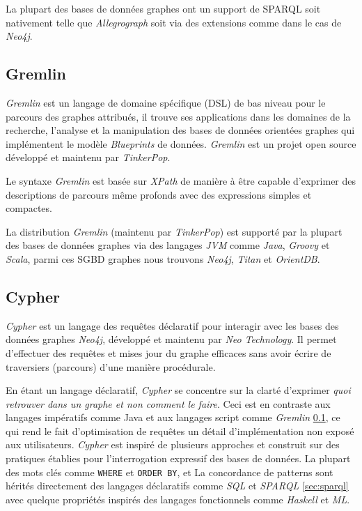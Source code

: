  La plupart des bases de données graphes ont un support de
  \textsc{SPARQL} soit nativement telle que \emph{Allegrograph} soit
  via des extensions comme dans le cas de \emph{Neo4j}.

  \subsection{Gremlin}
  \label{sec:gremlin}
  \emph{Gremlin} \cite{gremlin-wiki} est un langage de domaine
  spécifique (\acrshort{DSL}) de bas niveau pour le parcours des
  graphes attribués, il trouve ses applications dans les domaines de
  la recherche, l'analyse et la manipulation des bases de données
  orientées graphes qui implémentent le modèle \emph{Blueprints}
  \cite{blueprints} de données. \emph{Gremlin} \cite{gremlin-wiki} est
  un projet open source développé et maintenu par
  \emph{TinkerPop}.\medskip

  Le syntaxe \emph{Gremlin} est basée sur \emph{XPath} de manière à
  être capable d'exprimer des descriptions de parcours même profonds
  avec des expressions simples et compactes.\medskip

  La distribution \emph{Gremlin} (maintenu par \emph{TinkerPop}) est
  supporté par la plupart des bases de données graphes via des
  langages \emph{JVM} comme \emph{Java}, \emph{Groovy} et
  \emph{Scala}, parmi ces \acrshort{SGBD} graphes nous trouvons
  \emph{Neo4j}, \emph{Titan} et \emph{OrientDB}.

  \newpage
  \subsection{Cypher}
  \label{sec:cypher}
  \emph{Cypher} \cite{cypher-docs} est un langage des requêtes
  déclaratif pour interagir avec les bases des données graphes
  \emph{Neo4j}, développé et maintenu par \emph{Neo Technology}. Il
  permet d'effectuer des requêtes et mises jour du graphe efficaces
  sans avoir écrire de traversiers (parcours) d'une manière
  procédurale.\medskip

  En étant un langage déclaratif, \emph{Cypher} se concentre sur la
  clarté d'exprimer \textit{quoi retrouver dans un graphe et non
    comment le faire}. Ceci est en contraste aux langages impératifs
  comme Java et aux langages script comme \emph{Gremlin}
  \ref{sec:gremlin}, ce qui rend le fait d'optimisation de requêtes un
  détail d'implémentation non exposé aux utilisateurs. \emph{Cypher}
  est inspiré de plusieurs approches et construit sur des pratiques
  établies pour l'interrogation expressif des bases de données. La
  plupart des mots clés comme \verb|WHERE| et \verb|ORDER BY|, et La
  concordance de patterns sont hérités directement des langages
  déclaratifs comme \emph{SQL} et \emph{SPARQL} \ref{sec:sparql} avec
  quelque propriétés inspirés des langages fonctionnels comme
  \emph{Haskell} et \emph{ML}.\medskip

